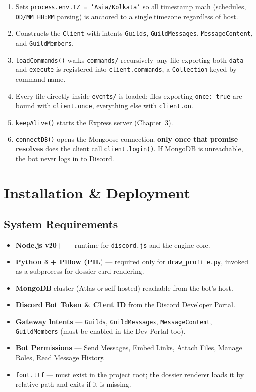 \documentclass[12pt,a4paper]{report}
\newcommand{\file}[1]{\texttt{\color{cyberpurple!80!black}#1}}
\begin{document}
\begin{enumerate}
    \item Sets \texttt{process.env.TZ = 'Asia/Kolkata'} so all timestamp math (schedules,
          \texttt{DD/MM HH:MM} parsing) is anchored to a single timezone regardless of host.
    \item Constructs the \texttt{Client} with intents \texttt{Guilds}, \texttt{GuildMessages},
          \texttt{MessageContent}, and \texttt{GuildMembers}.
    \item \texttt{loadCommands()} walks \file{commands/} recursively; any file exporting both
          \texttt{data} and \texttt{execute} is registered into \texttt{client.commands}, a
          \texttt{Collection} keyed by command name.
    \item Every file directly inside \file{events/} is loaded; files exporting \texttt{once: true}
          are bound with \texttt{client.once}, everything else with \texttt{client.on}.
    \item \texttt{keepAlive()} starts the Express server (Chapter~3).
    \item \texttt{connectDB()} opens the Mongoose connection; \textbf{only once that promise
          resolves} does the client call \texttt{client.login()}. If MongoDB is unreachable, the
          bot never logs in to Discord.
\end{enumerate}

\newpage
\chapter{Installation \& Deployment}

\section{System Requirements}

\begin{itemize}
    \item \textbf{Node.js v20+} --- runtime for \texttt{discord.js} and the engine core.
    \item \textbf{Python 3 + Pillow (PIL)} --- required only for \texttt{draw\_profile.py},
          invoked as a subprocess for dossier card rendering.
    \item \textbf{MongoDB} cluster (Atlas or self-hosted) reachable from the bot's host.
    \item \textbf{Discord Bot Token \& Client ID} from the Discord Developer Portal.
    \item \textbf{Gateway Intents} --- \texttt{Guilds}, \texttt{GuildMessages},
          \texttt{MessageContent}, \texttt{GuildMembers} (must be enabled in the Dev Portal too).
    \item \textbf{Bot Permissions} --- Send Messages, Embed Links, Attach Files, Manage Roles,
          Read Message History.
    \item \file{font.ttf} --- must exist in the project root; the dossier renderer loads it by
          relative path and exits if it is missing.
\end{itemize}
\end{document}
